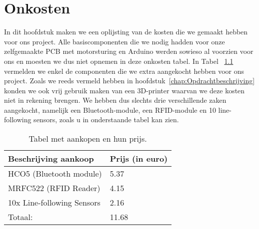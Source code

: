 \chapter{Onkosten}
In dit hoofdstuk maken we een oplijsting van de kosten die we gemaakt hebben voor ons project.  Alle basiscomponenten die we nodig hadden voor onze zelfgemaakte PCB met motorsturing en Arduino werden sowieso al voorzien voor ons en moesten we dus niet opnemen in deze onkosten tabel. In Tabel ~\ref{table:Onkosten} vermelden we enkel de componenten die we extra aangekocht hebben voor ons project. Zoals we reeds vermeld hebben in hoofdstuk~\ref{chap:Opdrachtbeschrijving} konden we ook vrij gebruik maken van een 3D-printer waarvan we deze kosten niet in rekening brengen. We hebben dus slechts drie verschillende zaken aangekocht, namelijk een Bluetooth-module, een RFID-module en 10 line-following sensors, zoals u in onderstaande tabel kan zien.\\
\begin {table}[H]
\caption {Tabel met aankopen en hun prijs.} \label{table:Onkosten}
\begin{center}
	\begin{tabular}{ | l | l | }
	\hline
	Beschrijving aankoop & Prijs (in euro) \\ \hline
	\hline
	HCO5 (Bluetooth module) & 5.37 \\ \hline
	MRFC522 (RFID Reader) & 4.15 \\ \hline
	10x Line-following Sensors & 2.16 \\ \hline \hline
	Totaal: & 11.68 \\ \hline
	\end{tabular}
\end{center}
\end{table}
